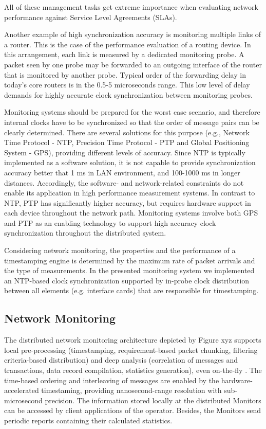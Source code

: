 \documentclass[journal]{IEEEtran}
\begin{document}
All of these management tasks get extreme importance when evaluating network performance against Service Level Agreements (SLAs). 

Another example of high synchronization accuracy is monitoring multiple links of a router. This is the case of the performance evaluation of a routing device. In this arrangement, each link is measured by a dedicated monitoring probe. A packet seen by one probe may be forwarded to an outgoing interface of the router that is monitored by another probe. Typical order of the forwarding delay in today’s core routers is in the 0.5-5 microseconds range.  This low level of delay demands for highly accurate clock synchronization between monitoring probes.

Monitoring systems should be prepared for the worst case scenario, and therefore internal clocks have to be synchronized so that the order of message pairs can be clearly determined. There are several solutions for this purpose (e.g., Network Time Protocol - NTP, Precision Time Protocol - PTP and Global Positioning System - GPS), providing different levels of accuracy. Since NTP is typically implemented as a software solution, it is not capable to provide synchronization accuracy better that 1 ms in LAN environment, and 100-1000 ms in longer distances. Accordingly, the software- and network-related constraints do not enable its application in high performance measurement systems. In contrast to NTP, PTP has significantly higher accuracy, but requires hardware support in each device throughout the network path. Monitoring systems involve both GPS and PTP as an enabling technology to support high accuracy clock synchronization throughout the distributed system. 

Considering network monitoring, the properties and the performance of a timestamping engine is determined by the maximum rate of packet arrivals and the type of measurements. In the presented monitoring system we implemented an NTP-based clock synchronization supported by in-probe clock distribution between all elements (e.g. interface cards) that are responsible for timestamping.

\subsection{Network Monitoring}

The distributed network monitoring architecture depicted by Figure xyz supports local pre-processing (timestamping, requirement-based packet chunking, filtering criteria-based distribution) and deep analysis (correlation of messages and transactions, data record compilation, statistics generation), even on-the-fly \cite{old_5}. The time-based ordering and interleaving of messages are enabled by the hardware-accelerated timestaming, providing nanosecond-range resolution with sub-microsecond precision. The information stored locally at the distributed Monitors can be accessed by client applications of the operator. Besides, the Monitors send periodic reports containing their calculated statistics.
\end{document}
